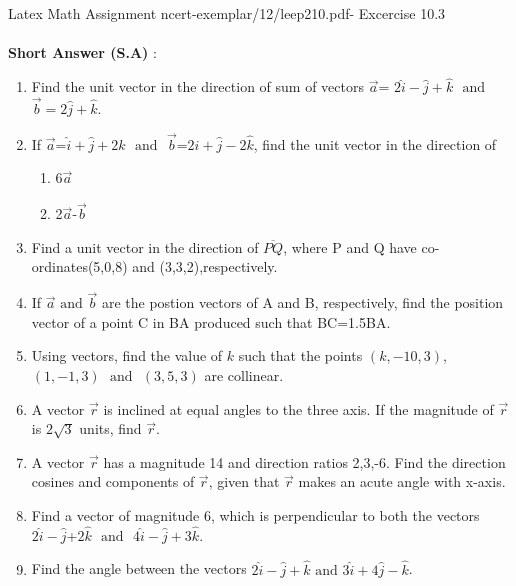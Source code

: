 \documentclass{article}
\begin{document}
\textbf{}
\\
\\Latex Math Assignment ncert-exemplar/12/leep210.pdf- Excercise 10.3\\
\textbf{}
\\
\textbf{Short Answer (S.A)}
:\\

\begin{enumerate}
\item Find the unit vector in the direction of sum of vectors $\vec{a}$= $2\hat{i}-\hat{j}+\hat{k}$ $\text{ and }$ $\vec{b}=2\hat{j}+\hat{k}$.

\item If $\vec{a}$=$\hat{i}+\hat{j}+2\hat{k}$ $\text{ and }$ $\vec{b}$=$2\hat{i}+\hat{j}-2\hat{k}$, find the unit vector in the direction of
	\begin{enumerate}
		\item 6$\vec{a}$   
		\item 2$\vec{a}$-$\vec{b}$
	\end{enumerate}

\item Find a unit vector in the direction of $\overline{PQ} $, where P and Q have co-ordinates(5,0,8) and (3,3,2),respectively.

\item If $\vec{a}$ $\text{and}$ $\vec{b}$ are the postion vectors of A and B, respectively, find the position vector of a point C in BA produced such that BC=1.5BA.

\item Using vectors, find the value of $k$ such that the points $(k,-10,3)$, $(1,-1,3)$ $\text{ and }$ $(3,5,3)$ are collinear.

\item A vector $\vec{r}$ is inclined at equal angles to the three axis. If the magnitude of $\vec{r}$ is $2\sqrt{3}$ units, find $\vec{r}$.


\item A vector $\vec{r}$ has a magnitude 14 and direction ratios 2,3,-6. Find the direction cosines and components of $\vec{r}$, given that $\vec{r}$ makes an acute angle with x-axis.


\item Find a vector of magnitude 6, which is perpendicular to both the vectors $2\hat{i}-\hat{j}$+$2\hat{k}$ $\text{ and }$ $4\hat{i}-\hat{j}+3\hat{k}$.


\item Find the angle between the vectors $2\hat{i}-\hat{j}+\hat{k}$ $\text{and}$ $3\hat{i}+4\hat{j}-\hat{k}$.



\end{enumerate}
\end{document}
